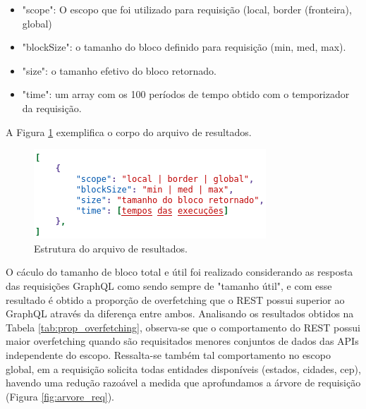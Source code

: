 \documentclass[conference]{IEEEtran}
\begin{document}
\begin{itemize}
    \item "scope": O escopo que foi utilizado para requisição (local, border (fronteira), global)
    \item "blockSize": o tamanho do bloco definido para requisição (min, med, max).
    \item "size": o tamanho efetivo do bloco retornado.
    \item "time": um array com os 100 períodos de tempo obtido com o temporizador da requisição.
\end{itemize}

A Figura \ref{fig:estrutura_resultados} exemplifica o corpo do arquivo de resultados.

\begin{figure}[htbp]
\centerline{\includegraphics[scale=0.45]{imgs/estrutura_resultados.png}}
\caption{Estrutura do arquivo de resultados.}
\label{fig:estrutura_resultados}
\end{figure}

O cáculo do tamanho de bloco total e útil foi realizado considerando as resposta das requisições GraphQL como sendo sempre de "tamanho útil", e com esse resultado é obtido a proporção de overfetching que o REST possui superior ao GraphQL através da diferença entre ambos. Analisando os resultados obtidos na Tabela \ref{tab:prop_overfetching}, observa-se que o comportamento do REST possui maior overfetching quando são requisitados menores conjuntos de dados das APIs independente do escopo. Ressalta-se também tal comportamento no escopo global, em a requisição solicita todas entidades disponíveis (estados, cidades, cep), havendo uma redução razoável a medida que aprofundamos a árvore de requisição (Figura \ref{fig:arvore_req}).
\end{document}
